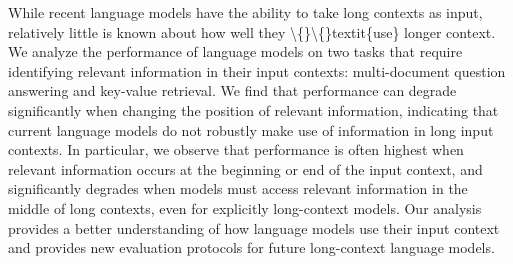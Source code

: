 While recent language models have the ability to take long contexts as input, relatively little is known about how well they \textbackslash\{\}\textbackslash\{\}textit\{use\} longer context. We analyze the performance of language models on two tasks that require identifying relevant information in their input contexts: multi-document question answering and key-value retrieval. We find that performance can degrade significantly when changing the position of relevant information, indicating that current language models do not robustly make use of information in long input contexts. In particular, we observe that performance is often highest when relevant information occurs at the beginning or end of the input context, and significantly degrades when models must access relevant information in the middle of long contexts, even for explicitly long-context models. Our analysis provides a better understanding of how language models use their input context and provides new evaluation protocols for future long-context language models.